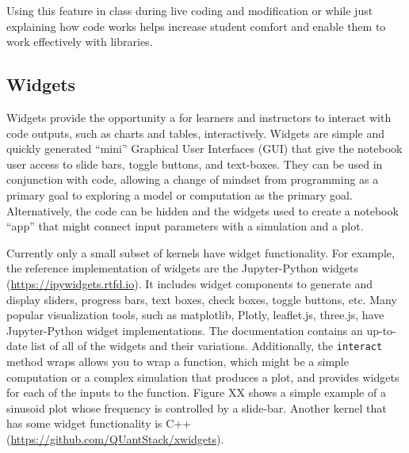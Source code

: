 \documentclass[]{book}
\begin{document}
Using this feature in class during live coding and modification or while
just explaining how code works helps increase student comfort and enable
them to work effectively with libraries.

\subsection{Widgets}\label{widgets}

Widgets provide the opportunity a for learners and instructors to
interact with code outputs, such as charts and tables, interactively.
Widgets are simple and quickly generated ``mini'' Graphical User
Interfaces (GUI) that give the notebook user access to slide bars,
toggle buttons, and text-boxes. They can be used in conjunction with
code, allowing a change of mindset from programming as a primary goal to
exploring a model or computation as the primary goal. Alternatively, the
code can be hidden and the widgets used to create a notebook ``app''
that might connect input parameters with a simulation and a plot.

Currently only a small subset of kernels have widget functionality. For
example, the reference implementation of widgets are the Jupyter-Python
widgets (\url{https://ipywidgets.rtfd.io}). It includes widget
components to generate and display sliders, progress bars, text boxes,
check boxes, toggle buttons, etc. Many popular visualization tools, such
as matplotlib, Plotly, leaflet.js, three.js, have Jupyter-Python widget
implementations. The documentation contains an up-to-date list of all of
the widgets and their variations. Additionally, the \texttt{interact}
method wraps allows you to wrap a function, which might be a simple
computation or a complex simulation that produces a plot, and provides
widgets for each of the inputs to the function. Figure XX shows a simple
example of a sinusoid plot whose frequency is controlled by a slide-bar.
Another kernel that has some widget functionality is C++
(\url{https://github.com/QUantStack/xwidgets}).
\end{document}

